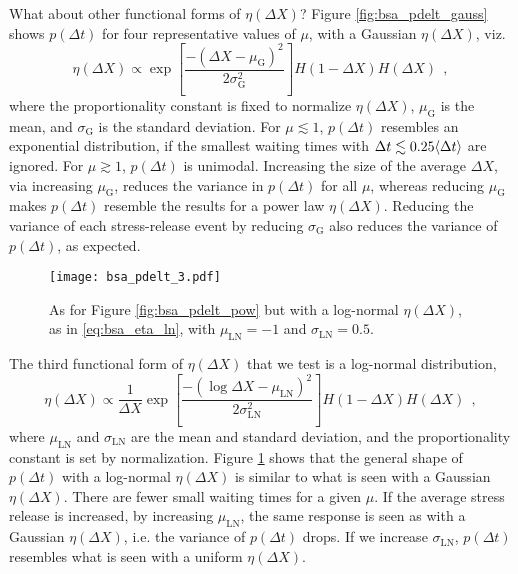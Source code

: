 What about other functional forms of $\eta(\Delta X)$? Figure \ref{fig:bsa_pdelt_gauss} shows $p(\Delta t)$ for four representative values of $\mu$, with a Gaussian $\eta(\Delta X)$, viz.
\begin{equation}
\label{eq:bsa_eta_gauss}
\eta(\Delta X) \propto \exp\left[\frac{-\left(\Delta X - \mu_\textrm{G}\right)^2}{2\sigma_\textrm{G}^2}\right] H(1 - \Delta X) H(\Delta X)\ \ ,
\end{equation}
where the proportionality constant is fixed to normalize $\eta(\Delta X)$, $\mu_\textrm{G}$ is the mean, and $\sigma_\textrm{G}$ is the standard deviation. For $\mu \lesssim 1$, $p(\Delta t)$ resembles an exponential distribution, if the smallest waiting times with $\Delta t \lesssim 0.25 \langle \Delta t \rangle$ are ignored. For $\mu \gtrsim 1$, $p(\Delta t)$ is unimodal. Increasing the size of the average $\Delta X$, via increasing $\mu_\textrm{G}$, reduces the variance in $p(\Delta t)$ for all $\mu$, whereas reducing $\mu_\textrm{G}$ makes $p(\Delta t)$ resemble the results for a power law $\eta(\Delta X)$. Reducing the variance of each stress-release event by reducing $\sigma_\textrm{G}$ also reduces the variance of $p(\Delta t)$, as expected.

\begin{figure}
\centering
\texttt{[image: bsa\_pdelt\_3.pdf]}
\caption{As for Figure \ref{fig:bsa_pdelt_pow} but with a log-normal $\eta(\Delta X)$, as in \eqref{eq:bsa_eta_ln}, with $\mu_\textrm{LN}=-1$ and $\sigma_\textrm{LN}=0.5$.}
\label{fig:bsa_pdelt_ln}
\end{figure}

The third functional form of $\eta(\Delta X)$ that we test is a log-normal distribution,
\begin{equation}
\label{eq:bsa_eta_ln}
\eta(\Delta X) \propto \frac{1}{\Delta X} \exp\left[\frac{-(\log \Delta X - \mu_{\textrm{LN}})^2}{2\sigma^2_\textrm{LN}} \right] H(1 - \Delta X) H(\Delta X)\ \ ,
\end{equation}
where $\mu_\textrm{LN}$ and $\sigma_\textrm{LN}$ are the mean and standard deviation, and the proportionality constant is set by normalization. Figure \ref{fig:bsa_pdelt_ln} shows that the general shape of $p(\Delta t)$ with a log-normal $\eta(\Delta X)$ is similar to what is seen with a Gaussian $\eta(\Delta X)$. There are fewer small waiting times for a given $\mu$. If the average stress release is increased, by increasing $\mu_\textrm{LN}$, the same response is seen as with a Gaussian $\eta(\Delta X)$, i.e. the variance of $p(\Delta t)$ drops. If we increase $\sigma_\textrm{LN}$, $p(\Delta t)$ resembles what is seen with a uniform $\eta(\Delta X)$.

